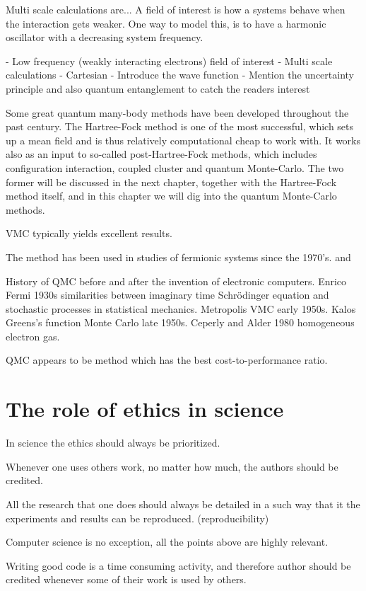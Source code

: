 Multi scale calculations are... A field of interest is how a systems behave when the interaction gets weaker. One way to model this, is to have a harmonic oscillator with a decreasing system frequency. 

- Low frequency (weakly interacting electrons) field of interest
- Multi scale calculations
- Cartesian
- Introduce the wave function
- Mention the uncertainty principle and also quantum entanglement to catch the readers interest

Some great quantum many-body methods have been developed throughout the past century. The Hartree-Fock method is one of the most successful, which sets up a mean field and is thus relatively computational cheap to work with. It works also as an input to so-called post-Hartree-Fock methods, which includes configuration interaction, coupled cluster and quantum Monte-Carlo. The two former will be discussed in the next chapter, together with the Hartree-Fock method itself, and in this chapter we will dig into the quantum Monte-Carlo methods. 

VMC typically yields excellent results.

The method has been used in studies of fermionic systems since the 1970's. \cite{deb_variational_2014} and 

History of QMC before and after the invention of electronic computers. Enrico Fermi 1930s similarities between imaginary time Schrödinger equation and stochastic processes in statistical mechanics. Metropolis VMC early 1950s. Kalos Greens's function Monte Carlo late 1950s. Ceperly and Alder 1980 homogeneous electron gas. 

QMC appears to be method which has the best cost-to-performance ratio.

\section{The role of ethics in science}
In science the ethics should always be prioritized. 

Whenever one uses others work, no matter how much, the authors should be credited. 

All the research that one does should always be detailed in a such way that it the experiments and results can be reproduced. (reproducibility) 

Computer science is no exception, all the points above are highly relevant.  

Writing good code is a time consuming activity, and therefore author should be credited whenever some of their work is used by others. 

